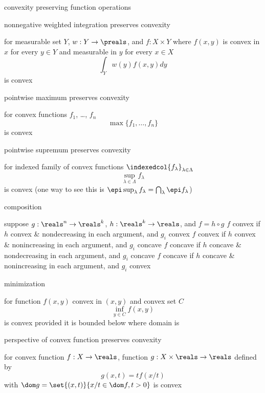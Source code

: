 \documentclass[17pt,landscape]{foils}
\begin{document}
{\begin{myproposition}{convexity preserving function operations}
	\item
		nonnegative weighted integration preserves convexity
		\bit
		\item
			for measurable set $Y$,
			$w:Y\to\preals$,
			and
			$f:X \times Y$
			where $f(x,y)$ is convex in $x$ for every $y\in Y$
			and measurable in $y$ for every $x\in X$
			$$
				\int_Y w(y) f(x,y) dy
			$$
			is convex
		\eit

	\item
		pointwise maximum preserves convexity
		\bit
		\item
			for convex functions $f_1$, \ldots, $f_n$
			$$
				\max\{f_1, \ldots, f_n\}
			$$
			is convex
		\eit

	\item
		pointwise supremum preserves convexity
		\bit
		\item
			for indexed family of convex functions $\indexedcol{f_\lambda}_{\lambda\in\Lambda}$
			$$
				\sup_{\lambda \in \Lambda} f_\lambda
			$$
			is convex
			(one way to see this is $\epi \sup_\lambda f_\lambda = \bigcap_\lambda \epi f_\lambda$)
		\eit
	\item
		composition
		\bit
		\item
			suppose $g:\reals^n\to\reals^k$, $h:\reals^k\to\reals$, and $f=h\circ g$
			\bit
			\iitem
				$f$ convex if $h$ convex \& nondecreasing in each argument, and $g_i$ convex
			\iitem
				$f$ convex if $h$ convex \& nonincreasing in each argument, and $g_i$ concave
			\iitem
				$f$ concave if $h$ concave \& nondecreasing in each argument, and $g_i$ concave
			\iitem
				$f$ concave if $h$ concave \& nonincreasing in each argument, and $g_i$ convex
			\eit
		\eit

	\item
		minimization
		\bit
		\item
			for function $f(x,y)$ convex in $(x,y)$ and convex set $C$
			$$
				\inf_{y\in C} f(x,y)
			$$
			is convex provided it is bounded below where domain is 
		\eit

	\item
		perspective of convex function preserves convexity
		\bit
		\item
			for convex function $f:X\to\reals$,
			function $g:X\times \reals \to \reals$
			defined by
			$$
				g(x,t) = tf(x/t)
			$$
			with $\dom g = \set{(x,t)}{x/t \in \dom f, t>0}$
			is convex
		\eit
	\eit
\end{myproposition}


}
\end{document}
